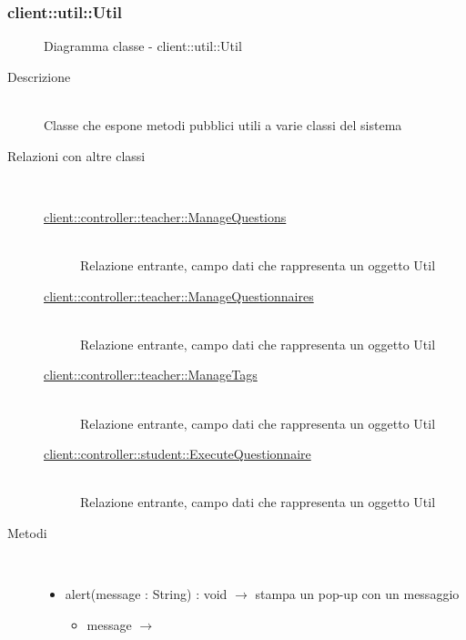 \subsubsection[Util]{client::util::Util}
\begin{figure}[H]
	\centering
	\caption{Diagramma classe - client::util::Util}
\end{figure}\begin{description}
\item[Descrizione] \hfill \\
Classe che espone metodi pubblici utili a varie classi del sistema
\item[Relazioni con altre classi] \hfill \\
\vspace{-7mm}
\begin{description}
	\item[\hyperlink{client::controller::teacher::ManageQuestions}{client::controller::teacher::ManageQuestions}] \hfill \\
	Relazione entrante, campo dati che rappresenta un oggetto Util
	\item[\hyperlink{client::controller::teacher::ManageQuestionnaires}{client::controller::teacher::ManageQuestionnaires}] \hfill \\
	Relazione entrante, campo dati che rappresenta un oggetto Util
	\item[\hyperlink{client::controller::teacher::ManageTags}{client::controller::teacher::ManageTags}] \hfill \\
	Relazione entrante, campo dati che rappresenta un oggetto Util
	\item[\hyperlink{client::controller::student::ExecuteQuestionnaire}{client::controller::student::ExecuteQuestionnaire}] \hfill \\
	Relazione entrante, campo dati che rappresenta un oggetto Util
\end{description}

\item[Metodi] \hfill \\
\vspace{-7mm}
\begin{itemize}
	\item alert(message : String) : void $\rightarrow$ stampa un pop-up con un messaggio\begin{itemize}
		\item message $\rightarrow$ 
	\end{itemize}
	

\end{itemize}
\end{description}
